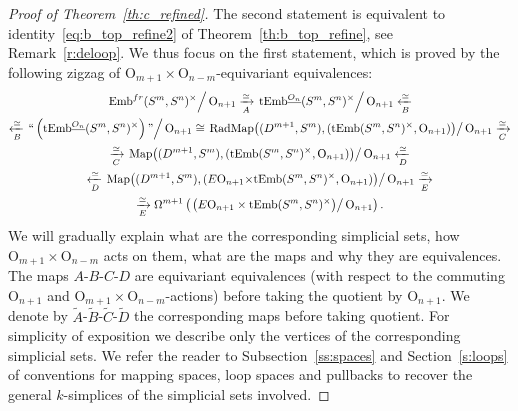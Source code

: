 \documentclass[11pt]{amsart}
\theoremstyle{definition}
\newcommand{\Embfr}{\mathrm{Emb}^{fr}}
\newcommand{\tEmb}{\mathrm{tEmb}}
\newcommand{\Map}{\mathrm{Map}}
\newcommand{\OO}{\mathrm{O}}
\numberwithin{equation}{section}
\begin{document}
\begin{proof}[Proof of Theorem~\ref{th:c_refined}]
The second statement is equivalent to identity~\eqref{eq:b_top_refine2} of Theorem~\ref{th:b_top_refine}, see Remark~\ref{r:deloop}.
We thus focus on the first statement, which is proved by the following zigzag of $\OO_{m+1}{\times}\OO_{n-m}$-equivariant equivalences:
\begin{multline}
\left.\Embfr(S^m,S^n)^\times\right/\OO_{n+1}\xrightarrow[A]{\simeq}
\left.\tEmb^{\underline{O_n}}(S^m,S^n)^\times\right/\OO_{n+1}\xleftarrow[B]{\simeq}\\
\xleftarrow[B]{\simeq}
 \left.\text{\lq\lq{}}\left(\tEmb^{\underline{O_n}}(S^m,S^n)^\times\right)\text{\rq\rq{}}\right/\OO_{n+1}\cong
\left.{\mathrm{RadMap}}\bigl( (D^{m+1},S^m),(\tEmb(S^m,S^n)^\times,\OO_{n+1})\bigr)\right/\OO_{n+1}   \xrightarrow[C]{\simeq}\\
 \xrightarrow[C]{\simeq} \left.\Map\bigl( (D^{m+1},S^m),(\tEmb(S^m,S^n)^\times,\OO_{n+1})\bigr)\right/\OO_{n+1}  \xleftarrow[D]{\simeq}  \\
\xleftarrow[D]{\simeq} \left. \Map\bigl( (D^{m+1},S^m),(E\OO_{n+1}{\times}\tEmb(S^m,S^n)^\times,\OO_{n+1})\bigr)\right/\OO_{n+1} \xrightarrow[E]{\simeq}\\
 \xrightarrow[E]{\simeq}\Omega^{m+1}\left(   \left.\left(E\OO_{n+1}\times \tEmb(S^m,S^n)^\times\right)\right/\OO_{n+1}\right).
\label{eq:long_zigzag}
\end{multline}
We will gradually explain what are the corresponding simplicial sets, how $\OO_{m+1}\times\OO_{n-m}$ acts on them, what are the maps and why they are equivalences. The maps $A$-$B$-$C$-$D$  %
are equivariant equivalences
(with respect to the commuting $\OO_{n+1}$ and $\OO_{m+1}\times\OO_{n-m}$-actions) before taking the quotient by $\OO_{n+1}$. We denote by $\tilde A$-$\tilde B$-$\tilde C$-$\tilde D$  %
the corresponding maps before taking quotient.
For simplicity of exposition we describe only the vertices of the corresponding simplicial sets. We refer the reader to Subsection~\ref{ss:spaces} and Section~\ref{s:loops} of conventions for mapping spaces, loop spaces and pullbacks
to recover the general $k$-simplices of the simplicial sets involved.


\end{proof}
\end{document}
